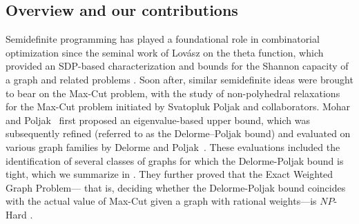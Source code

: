 \documentclass[a4paper,fleqn]{cas-sc}
\newcommand{\1}{\mathbf{1}}
\begin{document}
\subsection{Overview and our contributions}\label{overview}

Semidefinite programming has played a foundational role in combinatorial optimization since the seminal work of Lovász on the theta function, which provided an SDP-based characterization and bounds for the Shannon capacity of a graph and related problems \citep{lovasz1979shannon}. 
Soon after, similar semidefinite ideas were brought to bear on the Max-Cut problem, with the study of non-polyhedral relaxations for the Max-Cut problem initiated by Svatopluk Poljak and collaborators. Mohar and Poljak~\citep{moharpoljak1990eigenvalues} first proposed an eigenvalue-based upper bound, which was subsequently refined (referred to as the Delorme--Poljak bound) and evaluated on various graph families by Delorme and Poljak~\citep{delorme1993alaplacian,delorme1993combinatorial,delorme1993performance}. These evaluations included the identification of several classes of graphs for which the Delorme-Poljak bound is tight, which we summarize in . They further proved that the Exact Weighted Graph Problem— that is, deciding whether the Delorme-Poljak bound coincides with the actual value of Max-Cut given a graph with rational weights—is $NP$-Hard \citep{delorme1993combinatorial}.
\end{document}
